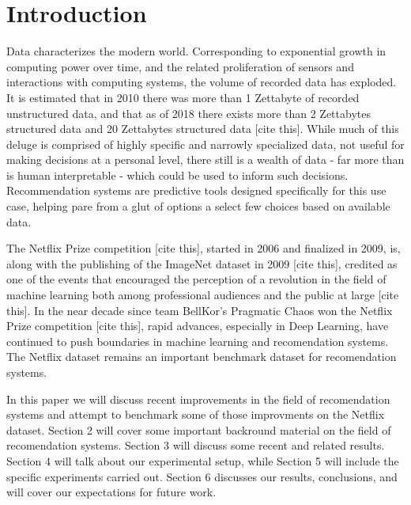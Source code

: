 \section{Introduction}
	Data characterizes the modern world. Corresponding to exponential growth in computing power over time, and the related proliferation of sensors and interactions with computing systems, the volume of recorded data has exploded. It is estimated that in 2010 there was more than 1 Zettabyte of recorded unstructured data, and that as of 2018 there exists more than 2 Zettabytes structured data and 20 Zettabytes structured data [cite this]. While much of this deluge is comprised of highly specific and narrowly specialized data, not useful for making decisions at a personal level, there still is a wealth of data - far more than is human interpretable - which could be used to inform such decisions. Recommendation systems are predictive tools designed specifically for this use case, helping pare from a glut of options a select few choices based on available data.\par
The Netflix Prize competition [cite this], started in 2006 and finalized in 2009, is, along with the publishing of the ImageNet dataset in 2009 [cite this], credited as one of the events that encouraged the perception of a revolution in the field of machine learning both among professional audiences and the public at large [cite this]. In the near decade since team BellKor's Pragmatic Chaos won the Netflix Prize competition [cite this], rapid advances, especially in Deep Learning, have continued to push boundaries in machine learning and recomendation systems. The Netflix dataset remains an important benchmark dataset for recomendation systems.\par
In this paper we will discuss recent improvements in the field of recomendation systems and attempt to benchmark some of those improvments on the Netflix dataset. Section 2 will cover some important backround material on the field of recomendation systems. Section 3 will discuss some recent and related results. Section 4 will talk about our experimental setup, while Section 5 will include the specific experiments carried out. Section 6 discusses our results, conclusions, and will cover our expectations for future work.

